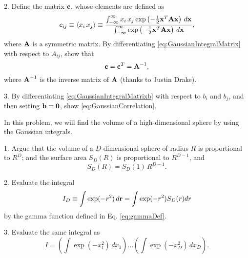 \documentclass{book}
\begin{document}
2.
Define the matrix $\boldsymbol{\mathbf{c}}$, whose elements are defined as
\begin{equation*}
c_{ij}
\equiv \langle x_i \, x_j \rangle
\equiv \frac {
  \int_{-\infty}^{\infty}
    x_i \, x_j \exp\left( -\frac{1}{2} \boldsymbol{\mathbf{x}}^T \boldsymbol{\mathbf{A}} \boldsymbol{\mathbf{x}} \right) \, d\boldsymbol{\mathbf{x}}
} {
\int_{-\infty}^{\infty}
  \exp\left( -\frac{1}{2} \boldsymbol{\mathbf{x}}^T \boldsymbol{\mathbf{A}} \boldsymbol{\mathbf{x}} \right) \, d\boldsymbol{\mathbf{x}}
},
\end{equation*}
%
where $\boldsymbol{\mathbf{A}}$ is a symmetric matrix.
%
By differentiating \eqref{eq:GaussianIntegralMatrix} with respect to $A_{ij}$, show that
%
\begin{equation}
  \boldsymbol{\mathbf{c}} = \boldsymbol{\mathbf{c}}^T = \boldsymbol{\mathbf{A}}^{-1},
  \label{eq:GaussianCorrelation}
\end{equation}
%
where
$\boldsymbol{\mathbf{A}}^{-1}$ is the inverse matrix of $\boldsymbol{\mathbf{A}}$
(thanks to Justin Drake).


3. By differentiating \eqref{eq:GaussianIntegralMatrixb} with respect to $b_i$ and $b_j$,
and then setting $\boldsymbol{\mathbf{b}} = \boldsymbol{\mathbf{0}}$, show \eqref{eq:GaussianCorrelation}.








In this problem, we will find the volume of a high-dimensional sphere
by using the Gaussian integrals.

1. Argue that the volume of a $D$-dimensional sphere of radius $R$ is proportional to
$R^D$; and the surface area $S_D(R)$ is proportional to $R^{D-1}$, and
\[
  S_D(R) = S_D(1) \, R^{D-1}.
\]

2. Evaluate the integral
\[
  I_D \equiv \int \exp(-r^2) \, d\boldsymbol{\mathbf{r}} = \int \exp(-r^2) S_D(r) dr
\]
by the gamma function defined in Eq. \eqref{eq:gammaDef}.

3. Evaluate the same integral as
\[
  I
  =
\left( \int \exp(-x_1^2) \, d x_1 \right)
\dots
\left( \int \exp(-x_D^2) \, d x_D \right).
\]
\end{document}
